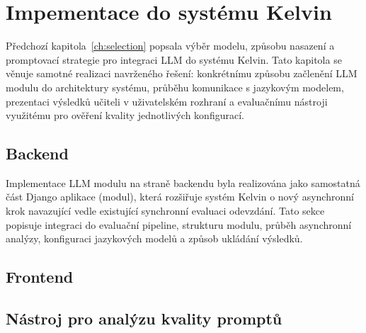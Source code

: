 \chapter{Impementace do systému Kelvin}
\label{ch:implementation}

Předchozí kapitola~\ref{ch:selection} popsala výběr modelu, způsobu nasazení a promptovací strategie pro integraci LLM do systému Kelvin.
Tato kapitola se věnuje samotné realizaci navrženého řešení: konkrétnímu způsobu začlenění LLM modulu do architektury systému, průběhu komunikace s jazykovým modelem, prezentaci výsledků učiteli v uživatelském rozhraní a evaluačnímu nástroji využitému pro ověření kvality jednotlivých konfigurací.

\section{Backend}
\label{sec:implementation-backend}

Implementace LLM modulu na straně backendu byla realizována jako samostatná část Django aplikace (modul), která rozšiřuje systém Kelvin o nový asynchronní krok navazující vedle existující synchronní evaluaci odevzdání.
Tato sekce popisuje integraci do evaluační pipeline, strukturu modulu, průběh asynchronní analýzy, konfiguraci jazykových modelů a způsob ukládání výsledků.








\section{Frontend}
\label{sec:implementation-frontend}

\section{Nástroj pro analýzu kvality promptů}
\label{sec:implementation-tool}

\endinput